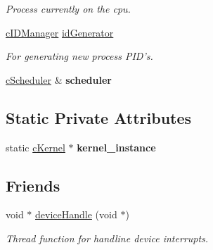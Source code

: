 \begin{DoxyCompactItemize}
\begin{DoxyCompactList}\small\item\em \-Process currently on the cpu. \end{DoxyCompactList}\item 
\hypertarget{classcKernel_a03d2c6943661797e86c030864890183e}{\hyperlink{classcIDManager}{c\-I\-D\-Manager} \hyperlink{classcKernel_a03d2c6943661797e86c030864890183e}{id\-Generator}}\label{db/da5/classcKernel_a03d2c6943661797e86c030864890183e}

\begin{DoxyCompactList}\small\item\em \-For generating new process \-P\-I\-D's. \end{DoxyCompactList}\item 
\hypertarget{classcKernel_a2187347881ef22432f28f82ad73a9bc5}{\hyperlink{classcScheduler}{c\-Scheduler} \& {\bfseries scheduler}}\label{db/da5/classcKernel_a2187347881ef22432f28f82ad73a9bc5}

\end{DoxyCompactItemize}
\subsection*{\-Static \-Private \-Attributes}
\begin{DoxyCompactItemize}
\item 
\hypertarget{classcKernel_ae757ff0479ba7ce5154aff58f493cfa9}{static \hyperlink{classcKernel}{c\-Kernel} $\ast$ {\bfseries kernel\-\_\-instance}}\label{db/da5/classcKernel_ae757ff0479ba7ce5154aff58f493cfa9}

\end{DoxyCompactItemize}
\subsection*{\-Friends}
\begin{DoxyCompactItemize}
\item 
void $\ast$ \hyperlink{classcKernel_af9d3f90a4d65f73fab17cccabb1350bd}{device\-Handle} (void $\ast$)
\begin{DoxyCompactList}\small\item\em \-Thread function for handline device interrupts. \end{DoxyCompactList}\end{DoxyCompactItemize}


